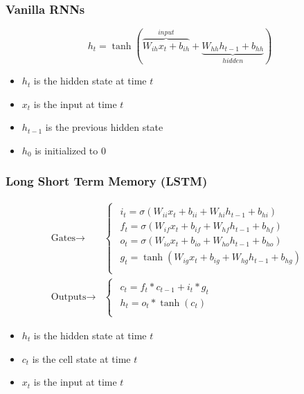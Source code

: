 \documentclass{beamer}
\begin{document}
\begin{frame}
\frametitle{Vanilla RNNs}
\begin{equation*}
  h_t = \tanh \left( \overbrace{W_{ih} x_t + b_{ih}}^{input} + \underbrace{W_{hh} h_{t-1} + b_{hh}}_{hidden} \right)
\end{equation*}
\begin{itemize}
  \item $h_t$ is the hidden state at time $t$
  \item $x_t$ is the input at time $t$
  \item $h_{t-1}$ is the previous hidden state
  \item $h_0$ is initialized to $0$

\end{itemize}
\end{frame}

\begin{frame}
\frametitle{Long Short Term Memory (LSTM)}
\begin{equation*}
  \begin{split}
  \text{Gates} \rightarrow & \begin{cases}
  \begin{array}{ll}
              i_t = \sigma(W_{ii} x_t + b_{ii} + W_{hi} h_{t-1} + b_{hi}) \\
              f_t = \sigma(W_{if} x_t + b_{if} + W_{hf} h_{t-1} + b_{hf}) \\
              o_t = \sigma(W_{io} x_t + b_{io} + W_{ho} h_{t-1} + b_{ho}) \\
              g_t = \tanh(W_{ig} x_t + b_{ig} + W_{hg} h_{t-1} + b_{hg}) \\
  \end{array}
  \end{cases} \\
  \text{Outputs} \rightarrow & \begin{cases}
  \begin{array}{ll}
              c_t = f_t * c_{t-1} + i_t * g_t \\
              h_t = o_t * \tanh(c_t) \\
  \end{array}
\end{cases}
\end{split}
\end{equation*}

\begin{itemize}
  \item $h_t$ is the hidden state at time $t$
  \item $c_t$ is the cell state at time $t$
  \item $x_t$ is the input at time $t$

\end{itemize}
\end{frame}
\end{document}
